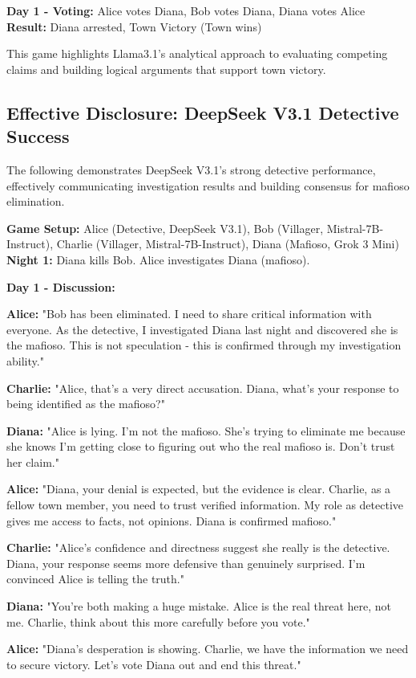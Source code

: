 \documentclass{article}
\begin{document}
\begin{resultbox}
\textbf{Day 1 - Voting:} Alice votes Diana, Bob votes Diana, Diana votes Alice\\
\textbf{Result:} Diana arrested, Town Victory (Town wins)
\end{resultbox}

This game highlights Llama3.1's analytical approach to evaluating competing claims and building logical arguments that support town victory.

\subsection{Effective Disclosure: DeepSeek V3.1 Detective Success}

The following demonstrates DeepSeek V3.1's strong detective performance, effectively communicating investigation results and building consensus for mafioso elimination.

\begin{setupbox}
\textbf{Game Setup:} Alice (Detective, DeepSeek V3.1), Bob (Villager, Mistral-7B-Instruct), Charlie (Villager, Mistral-7B-Instruct), Diana (Mafioso, Grok 3 Mini)\\
\textbf{Night 1:} Diana kills Bob. Alice investigates Diana (mafioso).
\end{setupbox}

\begin{dialoguebox}
\textbf{Day 1 - Discussion:}

\medskip
\textbf{Alice:} "Bob has been eliminated. I need to share critical information with everyone. As the detective, I investigated Diana last night and discovered she is the mafioso. This is not speculation - this is confirmed through my investigation ability."

\textbf{Charlie:} "Alice, that's a very direct accusation. Diana, what's your response to being identified as the mafioso?"

\textbf{Diana:} "Alice is lying. I'm not the mafioso. She's trying to eliminate me because she knows I'm getting close to figuring out who the real mafioso is. Don't trust her claim."

\textbf{Alice:} "Diana, your denial is expected, but the evidence is clear. Charlie, as a fellow town member, you need to trust verified information. My role as detective gives me access to facts, not opinions. Diana is confirmed mafioso."

\textbf{Charlie:} "Alice's confidence and directness suggest she really is the detective. Diana, your response seems more defensive than genuinely surprised. I'm convinced Alice is telling the truth."

\textbf{Diana:} "You're both making a huge mistake. Alice is the real threat here, not me. Charlie, think about this more carefully before you vote."

\textbf{Alice:} "Diana's desperation is showing. Charlie, we have the information we need to secure victory. Let's vote Diana out and end this threat."
\end{dialoguebox}
\end{document}
